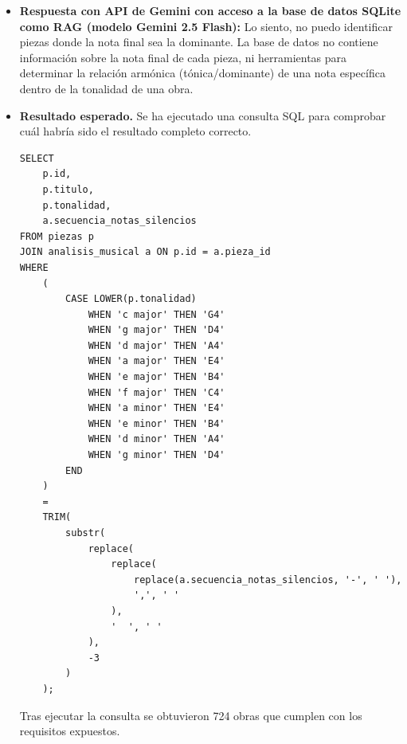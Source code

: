 \begin{itemize}
En resumen, las medidas 2 y 3 tienen una estructura donde la nota final es la dominante (quinto grado) en lugar de la tónica. Esto puede sugerir una estructura abierta o con un desarrollo más complejo."
\item \textbf{Respuesta con API de Gemini con acceso a la base de datos SQLite como RAG (modelo Gemini 2.5 Flash):} Lo siento, no puedo identificar piezas donde la nota final sea la dominante. La base de datos no contiene información sobre la nota final de cada pieza, ni herramientas para determinar la relación armónica (tónica/dominante) de una nota específica dentro de la tonalidad de una obra.
\item \textbf{Resultado esperado.} Se ha ejecutado una consulta SQL para comprobar cuál habría sido el resultado completo correcto.
    \begin{verbatim}
SELECT 
    p.id,
    p.titulo,
    p.tonalidad,
    a.secuencia_notas_silencios
FROM piezas p
JOIN analisis_musical a ON p.id = a.pieza_id
WHERE 
    (
        CASE LOWER(p.tonalidad)
            WHEN 'c major' THEN 'G4'
            WHEN 'g major' THEN 'D4'
            WHEN 'd major' THEN 'A4'
            WHEN 'a major' THEN 'E4'
            WHEN 'e major' THEN 'B4'
            WHEN 'f major' THEN 'C4'
            WHEN 'a minor' THEN 'E4'
            WHEN 'e minor' THEN 'B4'
            WHEN 'd minor' THEN 'A4'
            WHEN 'g minor' THEN 'D4'
        END
    )
    =
    TRIM(
        substr(
            replace(
                replace(
                    replace(a.secuencia_notas_silencios, '-', ' '),
                    ',', ' '
                ),
                '  ', ' '
            ),
            -3
        )
    );
    \end{verbatim}    
    Tras ejecutar la consulta se obtuvieron 724 obras que cumplen con los requisitos expuestos.

\end{itemize}

